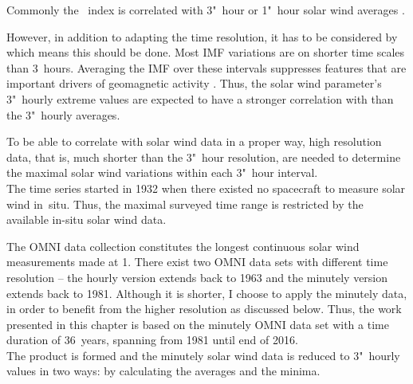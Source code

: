 Commonly the \Kp~index is correlated with 3"~hour or 1"~hour solar wind averages \citep{Newell2007,Elliott2013,Savani2017}.

However, in addition to adapting the time resolution, it has to be considered by which means this should be done. Most IMF variations are on shorter time scales than 3~hours. Averaging the IMF over these intervals suppresses features that are important drivers of geomagnetic activity \citep{Savani2017}. Thus, the solar wind parameter's 3"~hourly extreme values are expected to have a stronger correlation with \Kp{} than the 3"~hourly averages.

To be able to correlate \Kp{} with solar wind data in a proper way, high resolution data, that is, much shorter than the 3"~hour resolution, are needed to determine the maximal solar wind variations within each 3"~hour interval.\\

The \Kp{} time series started in 1932 when there existed no spacecraft to measure solar wind in~situ. Thus, the maximal surveyed time range is restricted by the available in-situ solar wind data.

The OMNI data collection constitutes the longest continuous solar wind measurements made at \SI{1}{\au}. There exist two OMNI data sets with different time resolution -- the hourly version extends back to 1963 and the minutely version extends back to 1981. Although it is shorter, I choose to apply the minutely data, in order to benefit from the higher resolution as discussed below. Thus, the work presented in this chapter is based on the minutely OMNI data set with a time duration of 36~years, spanning from 1981 until end of 2016.\\

The product \vBz{} is formed and the minutely solar wind data is reduced to 3"~hourly values in two ways: by calculating the averages and the minima.

